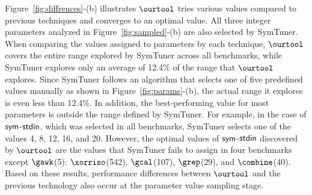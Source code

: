 Figure~\ref{fig:diffrences}-(b) illustrates $\ourtool$ tries various values compared to previous techniques and converges to an optimal value. All three integer parameters analyzed in Figure~\ref{fig:sampled}-(b) are also selected by SymTuner. When comparing the values assigned to parameters by each technique, $\ourtool$ covers the entire range explored by SymTuner across all benchmarks, while SymTuner explores only an average of 12.4\% of the range that $\ourtool$ explores. Since SymTuner follows an algorithm that selects one of five predefined values manually as shown in Figure~\ref{fig:params}-(b), the actual range it explores is even less than 12.4\%. In addition, the best-performing value for most parameters is outside the range defined by SymTuner. For example, in the case of ${\sf sym}$-${\sf stdin}$, which was selected in all benchmarks, SymTuner selects one of the values 4, 8, 12, 16, and 20. However, the optimal values of ${\sf sym}$-${\sf stdin}$ discovered by $\ourtool$ are the values that SymTuner fails to assign in four benchmarks except $\gawk$(5): $\xorriso$(542), $\gcal$(107), $\grep$(29), and $\combine$(40). Based on these results, performance differences between $\ourtool$ and the previous technology also occur at the parameter value sampling stage.



